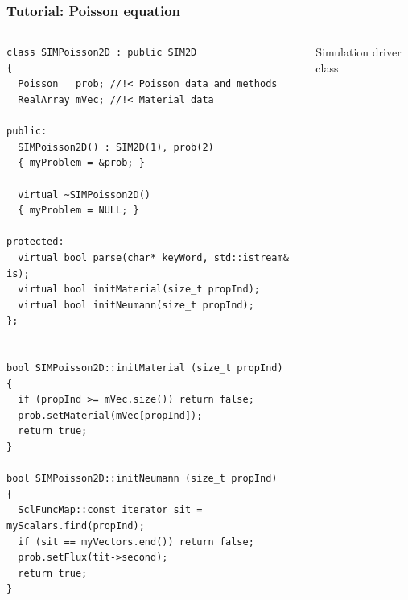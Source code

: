 \documentclass{beamer}
\begin{document}
\begin{frame}[fragile] %
 \frametitle{Tutorial: Poisson equation}

 \begin{columns}[c]
  \tiny\begin{verbatim}
class SIMPoisson2D : public SIM2D
{
  Poisson   prob; //!< Poisson data and methods
  RealArray mVec; //!< Material data

public:
  SIMPoisson2D() : SIM2D(1), prob(2)
  { myProblem = &prob; }

  virtual ~SIMPoisson2D()
  { myProblem = NULL; }

protected:
  virtual bool parse(char* keyWord, std::istream& is);
  virtual bool initMaterial(size_t propInd);
  virtual bool initNeumann(size_t propInd);
};


bool SIMPoisson2D::initMaterial (size_t propInd)
{
  if (propInd >= mVec.size()) return false;
  prob.setMaterial(mVec[propInd]);
  return true;
}

bool SIMPoisson2D::initNeumann (size_t propInd)
{
  SclFuncMap::const_iterator sit = myScalars.find(propInd);
  if (sit == myVectors.end()) return false;
  prob.setFlux(tit->second);
  return true;
}
  \end{verbatim}
  \small
  Simulation driver class
 \end{columns}
\end{frame}
\end{document}
